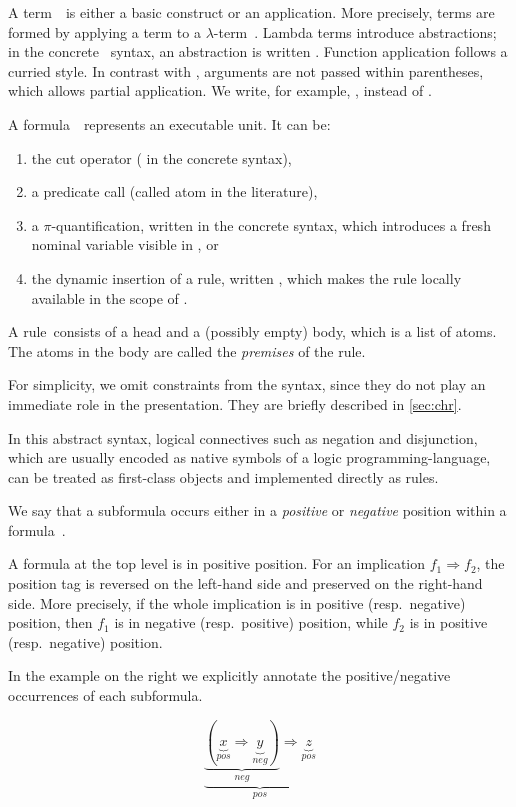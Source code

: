 A term~\TERM\ is either a basic construct or an application. More precisely,
terms are formed by applying a term to a $\lambda$-term~\LTERM.
Lambda terms introduce abstractions; in the concrete \elpi\ syntax, an
abstraction is written . Function application follows a curried
style. In contrast with \prolog, arguments are not passed within
parentheses, which allows partial application. We write, for example,
, instead of .

A formula~\ATOM\ represents an executable unit. It can be:
\begin{enumerate}
  \item the cut operator (\eI{!} in the concrete syntax),
  \item a predicate call (called atom in the literature),
  \item a $\pi$-quantification, written  in the concrete syntax,
        which introduces a fresh nominal variable  visible in , or
  \item the dynamic insertion of a rule, written , which
        makes the rule  locally available in the scope of .
\end{enumerate}

A rule\ consists of a head and a (possibly empty) body, which is a
list of atoms. The atoms in the body are called the \emph{premises} of the rule.

For simplicity, we omit constraints from the syntax, since they
do not play an immediate role in the presentation. They are briefly
described in \cref{sec:chr}.

In this abstract syntax, logical connectives such as negation and disjunction,
which are usually encoded as native symbols of a logic programming-language,
can be treated as first-class objects and implemented directly as \elpi rules.

We say that a subformula occurs either in a \emph{positive} or
\emph{negative} position within a formula~\cite{miller2012}.

\noindent
\begin{minipage}{0.75\textwidth}
A formula at the top level is in positive position. For an implication
$f_1 \Rightarrow f_2$, the position tag is reversed on the left-hand side
and preserved on the right-hand side. More precisely, if the whole
implication is in positive (resp.\ negative) position, then $f_1$ is in
negative (resp.\ positive) position, while $f_2$ is in positive
(resp.\ negative) position.

In the example on the right we explicitly annotate the positive/negative
occurrences of each subformula.
\end{minipage}
\begin{minipage}{0.25\textwidth}
\[
\underbrace{\underbrace{(\underbrace{x}_{pos} \Rightarrow
\underbrace{y}_{neg})}_{neg} \Rightarrow
\underbrace{z}_{pos}}_{pos}
\]  
\phantom{aa}
\end{minipage}

